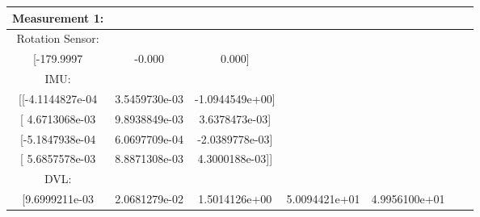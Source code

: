 \documentclass[]{article}
\begin{document}
\begin{table}[H]
	\begin{center}
		\begin{tabular}{ccccccc}
			\toprule
			
			\footnotesize Measurement 1: & \footnotesize  & \footnotesize & \footnotesize  & \footnotesize & \footnotesize & \footnotesize \\
			
			\midrule
			
			\footnotesize Rotation Sensor: & \footnotesize  & \footnotesize & \footnotesize  & \footnotesize  & \footnotesize  & \footnotesize \\
			
			\footnotesize [-179.9997 & \footnotesize -0.000 & \footnotesize 0.000] & \footnotesize  & \footnotesize & \footnotesize & \footnotesize \\
			
			
			\footnotesize IMU: & \footnotesize  & \footnotesize & \footnotesize & \footnotesize  & \footnotesize & \footnotesize \\
			
			
			\footnotesize [[-4.1144827e-04 & \footnotesize 3.5459730e-03 & \footnotesize -1.0944549e+00] & \footnotesize  & \footnotesize  & \footnotesize & \footnotesize \\
			
			
			\footnotesize [ 4.6713068e-03 & \footnotesize 9.8938849e-03 & \footnotesize 3.6378473e-03] & \footnotesize  & \footnotesize& \footnotesize & \footnotesize \\
			
			\footnotesize [-5.1847938e-04 & \footnotesize 6.0697709e-04 & \footnotesize -2.0389778e-03] & \footnotesize  & \footnotesize & \footnotesize & \footnotesize  \\
			
			\footnotesize [ 5.6857578e-03 & \footnotesize 8.8871308e-03  & \footnotesize 4.3000188e-03]] & \footnotesize & \footnotesize & \footnotesize & \footnotesize \\
			
			\footnotesize DVL: & \footnotesize  & \footnotesize  & \footnotesize  & \footnotesize  & \footnotesize & \footnotesize \\
			
			\footnotesize [9.6999211e-03 & \footnotesize 2.0681279e-02 & \footnotesize 1.5014126e+00 & \footnotesize 5.0094421e+01 & \footnotesize 4.9956100e+01 & \footnotesize & \footnotesize \\
			

\end{tabular}
\end{center}
\end{table}
\end{document}
